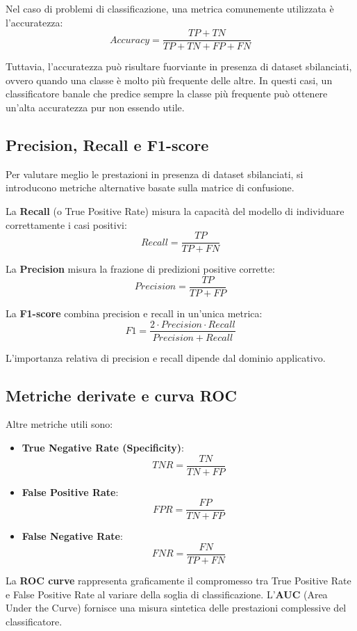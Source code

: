 \documentclass[a4paper,12pt]{report}
\begin{document}
Nel caso di problemi di classificazione, una metrica comunemente utilizzata è l’accuratezza:
\[
Accuracy = \frac{TP + TN}{TP + TN + FP + FN}
\]

Tuttavia, l’accuratezza può risultare fuorviante in presenza di dataset sbilanciati, ovvero quando una classe è molto più frequente delle altre.
In questi casi, un classificatore banale che predice sempre la classe più frequente può ottenere un’alta accuratezza pur non essendo utile.

\subsection{Precision, Recall e F1-score}

Per valutare meglio le prestazioni in presenza di dataset sbilanciati, si introducono metriche alternative basate sulla matrice di confusione.

La \textbf{Recall} (o True Positive Rate) misura la capacità del modello di individuare correttamente i casi positivi:
\[
Recall = \frac{TP}{TP + FN}
\]

La \textbf{Precision} misura la frazione di predizioni positive corrette:
\[
Precision = \frac{TP}{TP + FP}
\]

La \textbf{F1-score} combina precision e recall in un’unica metrica:
\[
F1 = \frac{2 \cdot Precision \cdot Recall}{Precision + Recall}
\]

L’importanza relativa di precision e recall dipende dal dominio applicativo.


\subsection{Metriche derivate e curva ROC}

Altre metriche utili sono:
\begin{itemize}
    \item \textbf{True Negative Rate (Specificity)}:
    \[
    TNR = \frac{TN}{TN + FP}
    \]
    \item \textbf{False Positive Rate}:
    \[
    FPR = \frac{FP}{TN + FP}
    \]
    \item \textbf{False Negative Rate}:
    \[
    FNR = \frac{FN}{TP + FN}
    \]
\end{itemize}

La \textbf{ROC curve} rappresenta graficamente il compromesso tra True Positive Rate e False Positive Rate al variare della soglia di classificazione.
L’\textbf{AUC} (Area Under the Curve) fornisce una misura sintetica delle prestazioni complessive del classificatore.
\end{document}
